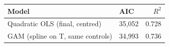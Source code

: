 
\begin{tabular}{llr}
\toprule
Model & AIC & $R^2$\\
\midrule
Quadratic OLS (final, centred) & 35,052 & 0.728\\
GAM (spline on T, same controls) & 34,993 & 0.736\\
\bottomrule
\end{tabular}
